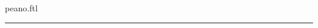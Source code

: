 \documentclass{stex}
\begin{document}
\begin{smodule}{peano.ftl}
\begin{forthel}






\end{forthel}

\vspace{1em}\hrule

\titleformat{\section}[hang]{\Large\bfseries}{}{0em}{}

\printbibliography
{}

\end{smodule}
\end{document}
